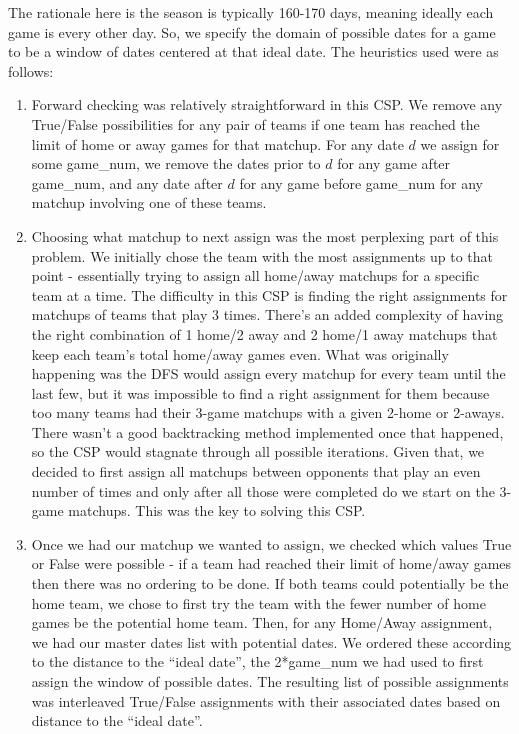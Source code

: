 \documentclass{article}
\begin{document}
	The rationale here is the season is typically 160-170 days, meaning ideally each game is every other day. So, we specify the domain of possible dates for a game to be a window of dates centered at that ideal date. The heuristics used were as follows:
	\begin{enumerate}
		\item Forward checking was relatively straightforward in this CSP. We remove any True/False possibilities for any pair of teams if one team has reached the limit of home or away games for that matchup. For any date $d$ we assign for some game\_num, we remove the dates prior to $d$ for any game after game\_num, and any date after $d$ for any game before game\_num for any matchup involving one of these teams.
		\item Choosing what matchup to next assign was the most perplexing part of this problem. We initially chose the team with the most assignments up to that point - essentially trying to assign all home/away matchups for a specific team at a time. The difficulty in this CSP is finding the right assignments for matchups of teams that play 3 times. There's an added complexity of having the right combination of 1 home/2 away and 2 home/1 away matchups that keep each team's total home/away games even. What was originally happening was the DFS would assign every matchup for every team until the last few, but it was impossible to find a right assignment for them because too many teams had their 3-game matchups with a given 2-home or 2-aways. There wasn't a good backtracking method implemented once that happened, so the CSP would stagnate through all possible iterations. Given that, we decided to first assign all matchups between opponents that play an even number of times and only after all those were completed do we start on the 3-game matchups. This was the key to solving this CSP.
		\item Once we had our matchup we wanted to assign, we checked which values True or False were possible - if a team had reached their limit of home/away games then there was no ordering to be done. If both teams could potentially be the home team, we chose to first try the team with the fewer number of home games be the potential home team. Then, for any Home/Away assignment, we had our master dates list with potential dates. We ordered these according to the distance to the ``ideal date'', the 2*game\_num we had used to first assign the window of possible dates. The resulting list of possible assignments was interleaved True/False assignments with their associated dates based on distance to the ``ideal date''.

\end{enumerate}
\end{document}
